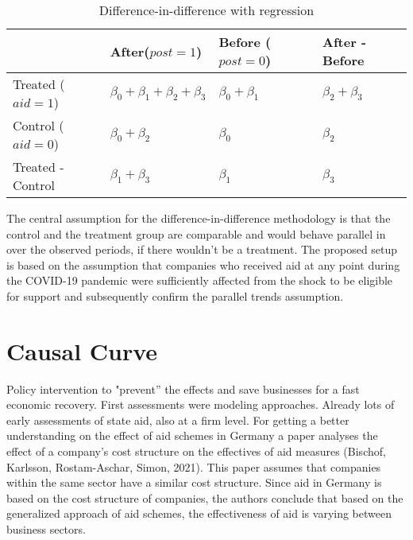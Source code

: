 \begin{table}%
\caption{Difference-in-difference with regression}
\label{tab:DiDcoefficient}
\centering
\def\arraystretch{1.5}

\begin{tabular}{l|l|l|l|}
    \cline{2-4}
                                            & After($post=1$) & Before ($post=0$)& After - Before \\ \hline
    \multicolumn{1}{|l|}{Treated ($aid=1$)}           &  $\beta_{0}+\beta_{1}+\beta_{2}+\beta_{3}$     &  $\beta_{0}+\beta_{1}$      &   $\beta_{2}+\beta_{3}$             \\ \hline
    \multicolumn{1}{|l|}{Control ($aid=0$)}           &  $\beta_{0}+\beta_{2}$     &  $\beta_{0}$      &   $\beta_{2}$             \\ \hline
    \multicolumn{1}{|l|}{Treated - Control} &  $\beta_{1}+\beta_{3}$     &  $\beta_{1}$      &   $\beta_{3}$             \\ \hline
    \end{tabular}

\end{table}

The central assumption for the difference-in-difference methodology is that the control and the treatment group are comparable and would behave parallel in over the observed periods, if there wouldn’t be a treatment. The proposed setup is based on the assumption that companies who received aid at any point during the COVID-19 pandemic were sufficiently affected from the shock to be eligible for support and subsequently confirm the parallel trends assumption.










\section{Causal Curve}

Policy intervention to "prevent” the effects and save businesses for a fast economic recovery.
First assessments were modeling approaches.
Already lots of early assessments of state aid, also at a firm level.
For getting a better understanding on the effect of aid schemes in Germany a paper analyses the effect of a company’s cost structure on the effectives of aid measures (Bischof, Karlsson, Rostam-Aschar, Simon, 2021). 
This paper assumes that companies within the same sector have a similar cost structure. 
Since aid in Germany is based on the cost structure of companies, the authors conclude that based on the generalized approach of aid schemes, the effectiveness of aid is varying between business sectors.